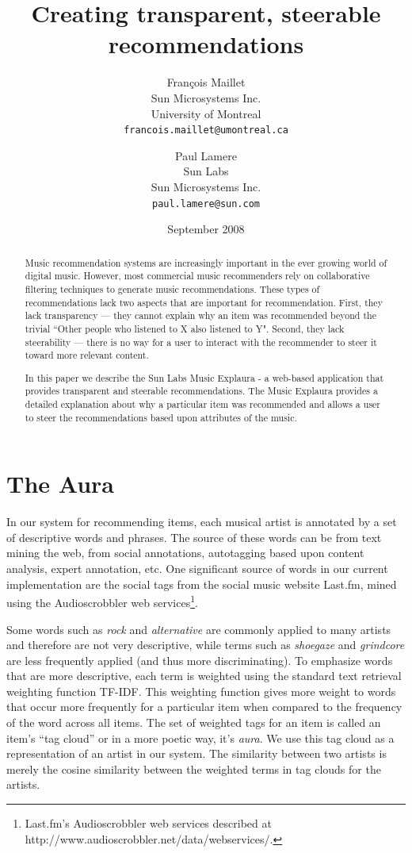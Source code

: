 \documentclass{article}
\title{Creating transparent, steerable recommendations}
\author{
Fran\c{c}ois Maillet\\
Sun Microsystems Inc.\\
University of Montreal\\
\texttt{francois.maillet@umontreal.ca}
\and 
Paul Lamere \\
Sun Labs\\
Sun Microsystems Inc.\\
\texttt{paul.lamere@sun.com}
}
\date{September 2008}
\begin{document}
\maketitle

\begin{abstract}

Music recommendation systems are increasingly important in the ever 
    growing world of digital music.  However, most commercial music 
    recommenders rely on collaborative filtering techniques to generate 
    music recommendations. These types of recommendations lack two aspects 
    that are important for recommendation.  First, they lack transparency 
    --- they cannot explain why an item was recommended beyond the trivial 
    ``Other people who listened to X also listened to Y". Second, they 
    lack steerability --- there is no way for a user to interact with the 
    recommender to steer it toward more relevant content.
    
    In this paper we describe the Sun Labs Music Explaura - a 
    web-based application that provides transparent and steerable 
    recommendations. The Music Explaura provides a detailed explanation 
    about why a particular item was recommended and allows a user to 
    steer the recommendations based upon attributes of the music.

\end{abstract}

\section{The Aura}

In our system for recommending items, each musical artist is annotated
by a set of descriptive words and phrases.  The source
of these words can be from text mining the web, from social
annotations, autotagging based upon content analysis, expert
annotation, etc.  One significant source of words in our current
implementation are the social tags from the social music website
Last.fm, mined using the Audioscrobbler web services\footnote{Last.fm's
Audioscrobbler web services described at
http://www.audioscrobbler.net/data/webservices/.}.

Some words such as \textit{rock} and \textit{alternative} are
commonly applied to many artists and therefore are not very descriptive,
while terms such as \textit{shoegaze} and \textit{grindcore} are
less frequently applied (and thus more discriminating).  To emphasize
words that are more descriptive, each term is weighted using the
standard text retrieval weighting function TF-IDF. This
weighting function gives more weight to words that occur more
frequently for a particular item when compared to the frequency of
the word across all items.  The set of weighted tags for an item
is called an item's ``tag cloud'' or in a more poetic way, it's
\textit{aura}.  We use this tag cloud as a representation of
an artist in our system. The similarity between two artists is merely
the cosine similarity between the weighted terms in tag clouds for the artists.
\end{document}
